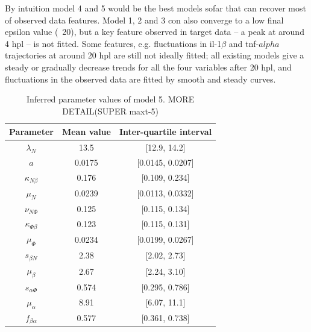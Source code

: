 By intuition model 4 and 5 would be the best models sofar that can recover most of observed data features. Model 1, 2 and 3 con also converge to a low final epsilon value (~20), but a key feature observed in target data -- a peak at around 4 hpl -- is not fitted. Some features, e.g. fluctuations in il-1$\beta$ and tnf-$alpha$ trajectories at around 20 hpl are still not ideally fitted; all existing models give a steady or gradually decrease trends for all the four variables after 20 hpl, and fluctuations in the observed data are fitted by smooth and steady curves.

\begin{table}[t!]
    \centering
    \begin{tabular}{|c c c|}
        \hline
        Parameter            & Mean value & Inter-quartile interval \\[0.5ex]
        \hline\hline
        $\lambda_N$          & 13.5       & [12.9, 14.2]            \\
        $a$                  & 0.0175     & [0.0145, 0.0207]        \\
        $\kappa_{N\beta}$    & 0.176      & [0.109, 0.234]          \\
        $\mu_N$              & 0.0239     & [0.0113, 0.0332]        \\
        $\nu_{N\Phi}$        & 0.125      & [0.115, 0.134]          \\
        \hline
        $\kappa_{\Phi\beta}$ & 0.123      & [0.115, 0.131]          \\
        $\mu_\Phi$           & 0.0234     & [0.0199, 0.0267]        \\
        \hline
        $s_{\beta N}$        & 2.38       & [2.02, 2.73]            \\
        $\mu_\beta$          & 2.67       & [2.24, 3.10]            \\
        \hline
        $s_{\alpha\Phi}$     & 0.574      & [0.295, 0.786]          \\
        $\mu_\alpha$         & 8.91       & [6.07, 11.1]            \\
        $f_{\beta\alpha}$    & 0.577      & [0.361, 0.738]          \\
        \hline
    \end{tabular}
    \caption[Inferred parameter values of model 5]
    {Inferred parameter values of model 5. MORE DETAIL(SUPER maxt-5)}
    \label{table:estimated5}
\end{table}

